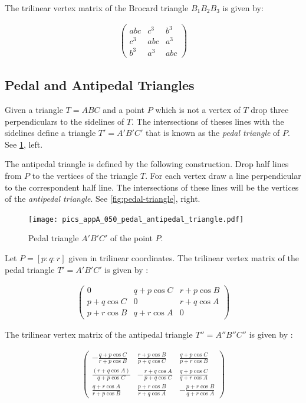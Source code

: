 The trilinear vertex matrix of the Brocard triangle $B_1B_2B_3$ is given by:

\begin{align*}
   \left(\begin{matrix} abc& c^3& b^3\\
   c^3&abc & a^3\\
   b^3 &a^3 &abc\end{matrix}\right)
\end{align*}

\subsection{Pedal and Antipedal Triangles}

Given a triangle $T=ABC$  and a point $P$ which is not a vertex of $T$ drop three perpendiculars to the sidelines of $T$. The intersections of theses lines with the sidelines define a triangle $T'=A'B'C'$ that is known as the {\em pedal triangle} of $P$. See \cref{fig:appA-pedal-triangle}, left.

The antipedal triangle is defined by the following construction.
Drop half lines from $P$ to the vertices of the triangle $T$. For each vertex draw a line perpendicular to the correspondent half  line. The intersections of these  lines will be the vertices of the {\em antipedal triangle}. See \cref{fig:pedal-triangle}, right.
 \begin{figure}[H]
      \texttt{[image: pics\_appA\_050\_pedal\_antipedal\_triangle.pdf]}
    \caption{Pedal triangle $A'B'C'$ of the point $P$.}
    \label{fig:appA-pedal-triangle}
\end{figure}

Let $P=[p:q:r]$ given in trilinear coordinates. The trilinear vertex matrix of the pedal triangle $T'=A'B'C'$ is given by \cite{mw}:

\begin{align*}
   \left(\begin{matrix} 0& q+p\cos C& r+p\cos B\\
   p+q\cos C &0 & r+q\cos A\\
   p+r\cos B & q+r\cos A &0\end{matrix}\right)
\end{align*}


The trilinear vertex matrix of the antipedal triangle $T''=A''B''C''$ is given by \cite{mw}:
 
\begin{align*}
   \left(\begin{matrix} - \frac{ q + p \cos C}{r + p \cos B}& \frac{r + p \cos B}{p + q \cos C}& \frac{q + p \cos C}{p + r \cos B}\\
    \frac{ (r + q \cos A)}{q + p \cos C}& -\frac{r + q \cos A}{p + q \cos  C}& \frac{q + p \cos C}{q + r \cos A}\\
   \frac{q + r \cos A}{r + p \cos B}&\frac{ p + r \cos B}{r + q \cos A} & - \frac{p + r \cos B}{q + r \cos A}\end{matrix}\right)
\end{align*}

